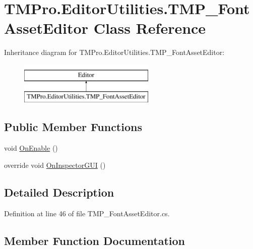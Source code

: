 \hypertarget{class_t_m_pro_1_1_editor_utilities_1_1_t_m_p___font_asset_editor}{}\section{T\+M\+Pro.\+Editor\+Utilities.\+T\+M\+P\+\_\+\+Font\+Asset\+Editor Class Reference}
\label{class_t_m_pro_1_1_editor_utilities_1_1_t_m_p___font_asset_editor}
Inheritance diagram for T\+M\+Pro.\+Editor\+Utilities.\+T\+M\+P\+\_\+\+Font\+Asset\+Editor\+:\begin{figure}[H]
\begin{center}
\leavevmode
\includegraphics[height=2.000000cm]{class_t_m_pro_1_1_editor_utilities_1_1_t_m_p___font_asset_editor}
\end{center}
\end{figure}
\subsection*{Public Member Functions}
\begin{DoxyCompactItemize}
\item 
void \mbox{\hyperlink{class_t_m_pro_1_1_editor_utilities_1_1_t_m_p___font_asset_editor_a73b246c279b3400a6efd902498c8083a}{On\+Enable}} ()
\item 
override void \mbox{\hyperlink{class_t_m_pro_1_1_editor_utilities_1_1_t_m_p___font_asset_editor_a6252b5aae39cc04893667c96c9960881}{On\+Inspector\+G\+UI}} ()
\end{DoxyCompactItemize}


\subsection{Detailed Description}


Definition at line 46 of file T\+M\+P\+\_\+\+Font\+Asset\+Editor.\+cs.



\subsection{Member Function Documentation}
\mbox{\label{class_t_m_pro_1_1_editor_utilities_1_1_t_m_p___font_asset_editor_a73b246c279b3400a6efd902498c8083a}} 
